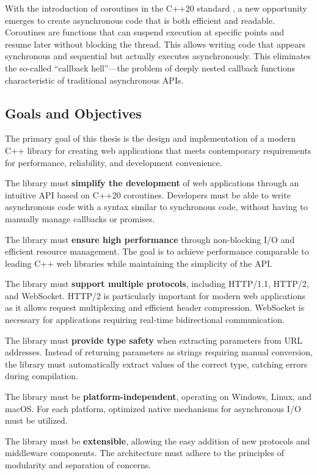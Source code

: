 With the introduction of coroutines in the C++20 standard \cite{cpp20standard}, a new opportunity emerges to create asynchronous code that is both efficient and readable. Coroutines are functions that can suspend execution at specific points and resume later without blocking the thread. This allows writing code that appears synchronous and sequential but actually executes asynchronously. This eliminates the so-called ``callback hell''---the problem of deeply nested callback functions characteristic of traditional asynchronous APIs.

\subsection{Goals and Objectives}

The primary goal of this thesis is the design and implementation of a modern C++ library for creating web applications that meets contemporary requirements for performance, reliability, and development convenience.

The library must \textbf{simplify the development} of web applications through an intuitive API based on C++20 coroutines. Developers must be able to write asynchronous code with a syntax similar to synchronous code, without having to manually manage callbacks or promises.

The library must \textbf{ensure high performance} through non-blocking I/O and efficient resource management. The goal is to achieve performance comparable to leading C++ web libraries while maintaining the simplicity of the API.

The library must \textbf{support multiple protocols}, including HTTP/1.1, HTTP/2, and WebSocket. HTTP/2 is particularly important for modern web applications as it allows request multiplexing and efficient header compression. WebSocket is necessary for applications requiring real-time bidirectional communication.

The library must \textbf{provide type safety} when extracting parameters from URL addresses. Instead of returning parameters as strings requiring manual conversion, the library must automatically extract values of the correct type, catching errors during compilation.

The library must be \textbf{platform-independent}, operating on Windows, Linux, and macOS. For each platform, optimized native mechanisms for asynchronous I/O must be utilized.

The library must be \textbf{extensible}, allowing the easy addition of new protocols and middleware components. The architecture must adhere to the principles of modularity and separation of concerns.

